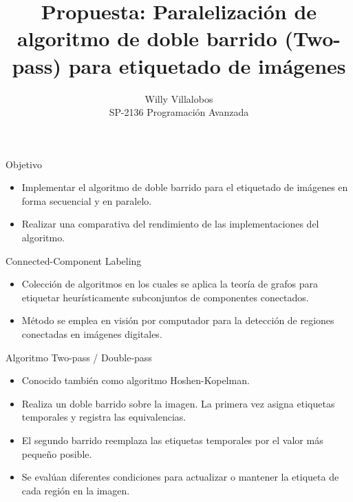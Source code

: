 \documentclass[aspectratio=169]{beamer}
\begin{document}
\title{Propuesta: Paralelización de algoritmo de doble barrido (Two-pass) para etiquetado de imágenes}
\author{Willy Villalobos\\SP-2136 Programación Avanzada}


\begin{frame}
    \titlepage

\end{frame}


\begin{frame}{Objetivo}
    \begin{itemize}
        \item Implementar el algoritmo de doble barrido para el etiquetado de imágenes en forma secuencial y en paralelo.
        \item Realizar una comparativa del rendimiento de las implementaciones del algoritmo.
    \end{itemize}

\end{frame}
\begin{frame}{Connected-Component Labeling}
    \begin{itemize}
        \item Colección de algoritmos en los cuales se aplica la teoría de grafos para etiquetar heurísticamente subconjuntos de componentes conectados.
        \item Método se emplea en visión por computador para la detección de regiones conectadas en imágenes digitales.
    \end{itemize}
\end{frame}

\begin{frame}{Algoritmo Two-pass / Double-pass}
    \begin{itemize}
        \item Conocido también como algoritmo Hoshen-Kopelman.
        \item Realiza un doble barrido sobre la imagen. La primera vez asigna etiquetas temporales y registra las equivalencias.
        \item El segundo barrido reemplaza las etiquetas temporales por el valor más pequeño posible.
        \item Se evalúan diferentes condiciones para actualizar o mantener la etiqueta de cada región en la imagen.
    \end{itemize}
\end{frame}
\end{document}

